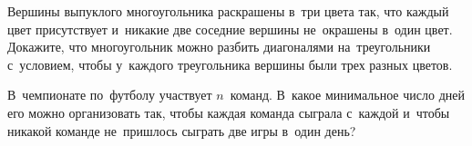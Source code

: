 \begin{problems}
\item
Вершины выпуклого многоугольника раскрашены в~три цвета так, что каждый цвет
присутствует и~никакие две соседние вершины не~окрашены в~один цвет.
Докажите, что многоугольник можно разбить диагоналями на~треугольники
с~условием, чтобы у~каждого треугольника вершины были трех разных цветов.

\item
В~чемпионате по~футболу участвует $n$~команд.
В~какое минимальное число дней его можно организовать так, чтобы каждая команда
сыграла с~каждой и~чтобы никакой команде не~пришлось сыграть две игры в~один
день?

\end{problems}


